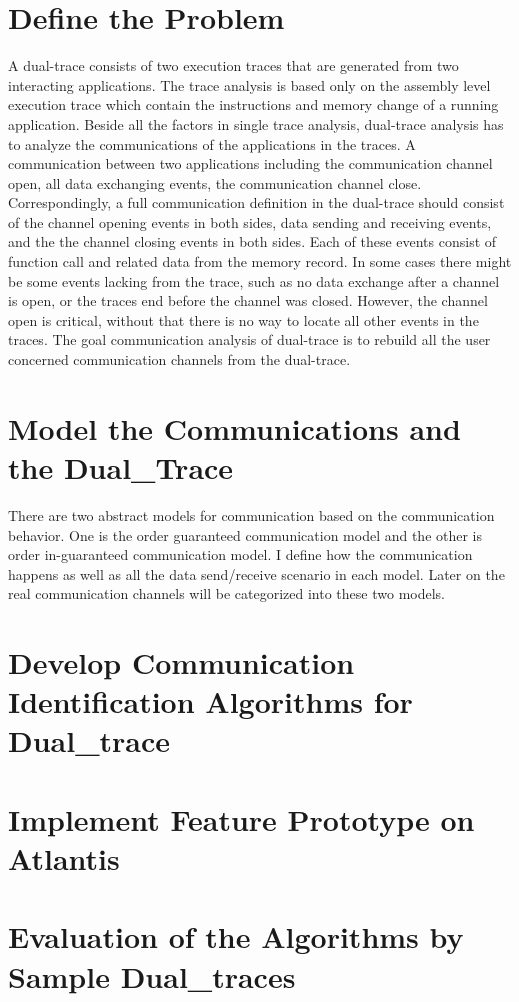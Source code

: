 \section{Define the Problem}
A dual-trace consists of two execution traces that are generated from two interacting applications. The trace analysis is based only on the assembly level execution trace which contain the instructions and memory change of a running application. Beside all the factors in single trace analysis, dual-trace analysis has to analyze the communications of the applications in the traces. A communication between two applications including the communication channel open, all data exchanging events, the communication channel close.  Correspondingly, a full communication definition in the dual-trace should consist of the channel opening events in both sides, data sending and receiving events, and the the channel closing events in both sides. Each of these events consist of function call and related data from the memory record. In some cases there might be some events lacking from the trace, such as no data exchange after a channel is open, or the traces end before the channel was closed. However, the channel open is critical, without that there is no way to locate all other events in the traces. The goal communication analysis of dual-trace is to rebuild all the user concerned communication channels from the dual-trace.

\section{Model the Communications and the Dual\_Trace}
There are two abstract models for communication based on the communication behavior. One is the order guaranteed communication model and the other is order in-guaranteed communication model. I define  how the communication happens as well as all the data send/receive scenario in each model. Later on the real communication channels will be categorized into these two models. 


\section{Develop Communication Identification Algorithms for Dual\_trace}


\section{Implement Feature Prototype on Atlantis}

\section{Evaluation of the Algorithms by Sample Dual\_traces }